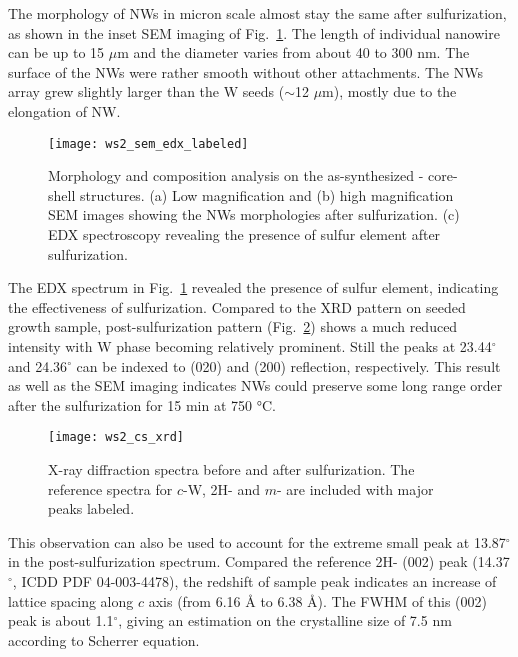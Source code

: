 The morphology of  NWs in micron scale almost stay the same after sulfurization, as shown in the inset SEM imaging of Fig.~\ref{fig:ch5ws2sem}. The length of individual nanowire can be up to 15 $\mu$m and the diameter varies from about 40 to 300 nm. The surface of the NWs were rather smooth without other attachments. The NWs array grew slightly larger than the W seeds ($\sim$12 $\mu$m), mostly due to the elongation of NW.
\begin{figure}[htb]
\centering
\texttt{[image: ws2\_sem\_edx\_labeled]}
\caption[Morphology and composition analysis on the as-synthesized - core-shell structures]{Morphology and composition analysis on the as-synthesized - core-shell structures. (a) Low magnification and (b) high magnification SEM images showing the NWs morphologies after sulfurization. (c) EDX spectroscopy revealing the presence of sulfur element after sulfurization.}
\label{fig:ch5ws2sem}
\end{figure}
The EDX spectrum in Fig.~\ref{fig:ch5ws2sem} revealed the presence of sulfur element, indicating the effectiveness of sulfurization. Compared to the XRD pattern on seeded growth  sample, post-sulfurization pattern (Fig.~\ref{fig:ch5ws2xrd}) shows a much reduced  intensity with W phase becoming relatively prominent. Still the peaks at 23.44$^{\circ}$ and 24.36$^{\circ}$ can be indexed to  (020) and (200) reflection, respectively. This result as well as the SEM imaging indicates  NWs could preserve some long range order after the sulfurization for 15 min at 750 \si{\degreeCelsius}. 
\begin{figure}[htb]
\centering
\texttt{[image: ws2\_cs\_xrd]}
\caption[X-ray diffraction spectra before and after sulfurization]{X-ray diffraction spectra before and after sulfurization. The reference spectra for $c$-W, 2H- and $m$- are included with major peaks labeled.}
\label{fig:ch5ws2xrd}
\end{figure}
This observation can also be used to account for the extreme small peak at 13.87$^{\circ}$ in the post-sulfurization spectrum. Compared the reference 2H- (002) peak (14.37$^{\circ}$, ICDD PDF 04-003-4478), the redshift of sample peak indicates an increase of lattice spacing along $c$ axis (from 6.16 \si{\angstrom} to 6.38 \si{\angstrom}). The FWHM of this (002) peak is about 1.1$^{\circ}$, giving an estimation on the crystalline size of 7.5 nm according to Scherrer equation. 

